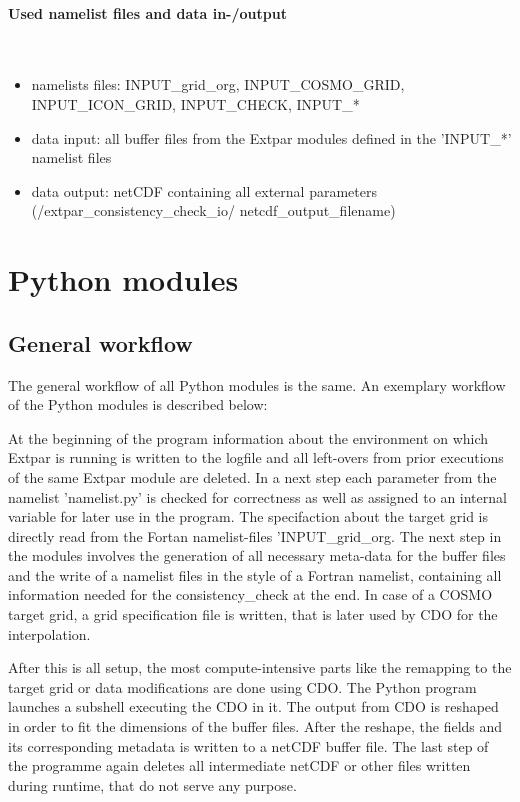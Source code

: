 \documentclass[a4paper,10pt,DIV14,BCOR1cm,titlepage,twoside]{scrartcl}
\begin{document}
\paragraph{Used namelist files and data in-/output}\ \par\medskip\noindent
\begin{itemize}
 \item namelists files: INPUT\_grid\_org, INPUT\_COSMO\_GRID, INPUT\_ICON\_GRID, INPUT\_CHECK, INPUT\_*
 \item data input: all buffer files from the Extpar modules defined in the 'INPUT\_*' namelist files
 \item data output: netCDF containing all external parameters (/extpar\_consistency\_check\_io/ netcdf\_output\_filename)
\end{itemize}

\clearpage

\section{Python modules}\label{Python modules}

\subsection{General workflow}\label{General workflow}
The general workflow of all Python modules is the same. An exemplary workflow of the Python modules is described below:

\noindent At the beginning of the program information about the environment on which Extpar is running is written to the logfile and all left-overs from prior executions of the same Extpar module are deleted. In a next step each parameter from the namelist 'namelist.py' is checked for correctness as well as assigned to an internal variable for later use in the program. The specifaction about the target grid is directly read from the Fortan namelist-files 'INPUT\_grid\_org. The next step in the modules involves the generation of all necessary meta-data for the buffer files and the write of a namelist files in the style of a Fortran namelist, containing all information needed for the consistency\_check at the end. In case of a COSMO target grid, a grid specification file is written, that is later used by CDO for the interpolation. 

\noindent After this is all setup, the most compute-intensive parts like the remapping to the target grid or data modifications are done using CDO. The Python program launches a subshell executing the CDO in it.
The output from CDO is reshaped in order to fit the dimensions of the buffer files. After the reshape, the fields and its corresponding metadata is written to a netCDF buffer file. The last step of the programme again deletes all intermediate netCDF or other files written during runtime, that do not serve any purpose.
\end{document}
